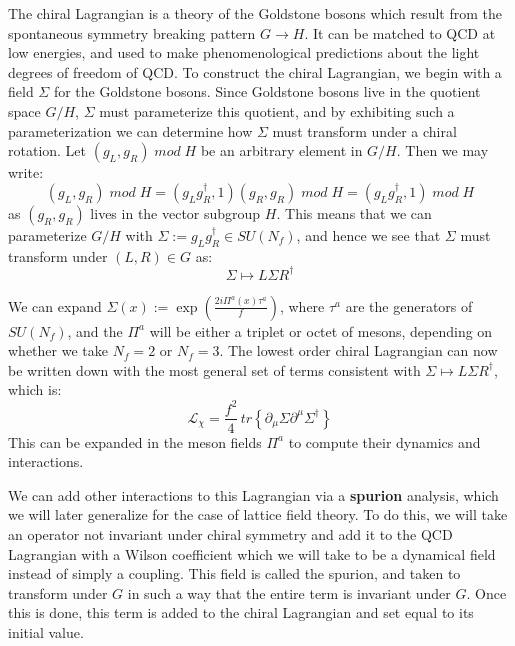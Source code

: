 \documentclass[11pt, oneside]{article}   	%
\theoremstyle{definition}
\begin{document}
The chiral Lagrangian is a theory of the Goldstone bosons which result from the spontaneous symmetry breaking 
pattern $G\rightarrow H$. It can be matched to QCD at low energies, and used to make phenomenological predictions 
about the light degrees of freedom of QCD. To construct the chiral Lagrangian, we begin with a field $\Sigma$ for the 
Goldstone bosons. Since Goldstone bosons live in the quotient space $G / H$, $\Sigma$ must parameterize this quotient, 
and by exhibiting such a parameterization we can determine how $\Sigma$ must transform under a chiral rotation. 
Let $(g_L, g_R)\;mod\; H$ be an arbitrary element in $G / H$. Then we may write:
\begin{equation}
	(g_L, g_R)\;mod\;H = (g_L g_R^\dagger, 1) (g_R, g_R)\;mod\; H = (g_L g_R^\dagger, 1) \;mod\; H
\end{equation}
as $(g_R, g_R)$ lives in the vector subgroup $H$. This means that we can parameterize $G / H$ with $\Sigma := g_L 
g_R^\dagger\in SU(N_f)$, and hence we see that $\Sigma$ must transform under $(L, R)\in G$ as:
\begin{equation}
	\Sigma\mapsto L\Sigma R^\dagger
\end{equation}

We can expand $\Sigma(x) := \exp\left(\frac{2i\Pi^a(x) \tau^a}{f}\right)$, where $\tau^a$ are the generators of $SU(N_f)$, 
and the $\Pi^a$ will be either a triplet or octet of mesons, depending on whether we take $N_f = 2$ or $N_f = 3$. The 
lowest order chiral Lagrangian can now be written down with the most general set of terms consistent with $\Sigma
\mapsto L\Sigma R^\dagger$, which is:
\begin{equation}
	\mathcal L_\chi = \frac{f^2}{4}\, tr\left\{\partial_\mu\Sigma \partial^\mu\Sigma^\dagger\right\}
\end{equation}
This can be expanded in the meson fields $\Pi^a$ to compute their dynamics and interactions. 

We can add other interactions to this Lagrangian via a \textbf{spurion} analysis, which we will later generalize for the 
case of lattice field theory. To do this, we will take an operator not invariant under chiral symmetry and add it to the QCD 
Lagrangian with a Wilson coefficient which we will take to be a dynamical field instead of simply a coupling. This field is 
called the spurion, and taken to transform under $G$ in such a way that the entire term is invariant under $G$. Once 
this is done, this term is added to the chiral Lagrangian and set equal to its initial value. 
\end{document}
